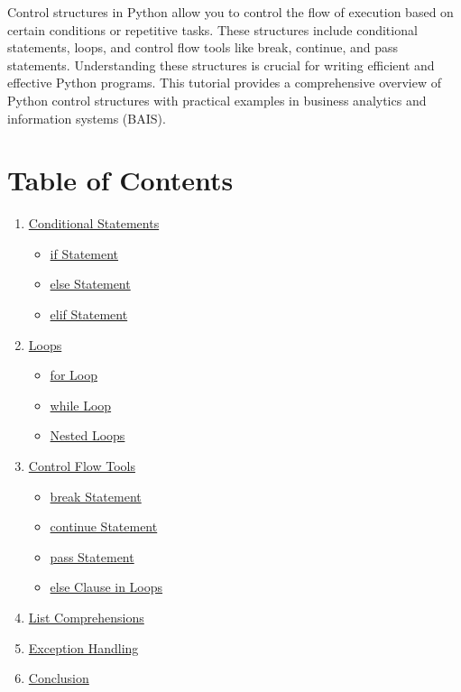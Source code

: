 \documentclass[
  letterpaper,
  DIV=11,
  numbers=noendperiod]{scrreprt}
\providecommand{\tightlist}{%
  \setlength{\itemsep}{0pt}\setlength{\parskip}{0pt}}\usepackage{longtable,booktabs,array}
\begin{document}
Control structures in Python allow you to control the flow of execution
based on certain conditions or repetitive tasks. These structures
include conditional statements, loops, and control flow tools like
break, continue, and pass statements. Understanding these structures is
crucial for writing efficient and effective Python programs. This
tutorial provides a comprehensive overview of Python control structures
with practical examples in business analytics and information systems
(BAIS).

\section{Table of Contents}\label{table-of-contents-1}

\begin{enumerate}
\def\labelenumi{\arabic{enumi}.}
\tightlist
\item
  \hyperref[conditional-statements]{Conditional Statements}

  \begin{itemize}
  \tightlist
  \item
    \hyperref[if-statement]{if Statement}
  \item
    \hyperref[else-statement]{else Statement}
  \item
    \hyperref[elif-statement]{elif Statement}
  \end{itemize}
\item
  \hyperref[loops]{Loops}

  \begin{itemize}
  \tightlist
  \item
    \hyperref[for-loop]{for Loop}
  \item
    \hyperref[while-loop]{while Loop}
  \item
    \hyperref[nested-loops]{Nested Loops}
  \end{itemize}
\item
  \hyperref[control-flow-tools]{Control Flow Tools}

  \begin{itemize}
  \tightlist
  \item
    \hyperref[break-statement]{break Statement}
  \item
    \hyperref[continue-statement]{continue Statement}
  \item
    \hyperref[pass-statement]{pass Statement}
  \item
    \hyperref[else-clause-in-loops]{else Clause in Loops}
  \end{itemize}
\item
  \hyperref[list-comprehensions]{List Comprehensions}
\item
  \hyperref[exception-handling]{Exception Handling}
\item
  \hyperref[conclusion]{Conclusion}
\end{enumerate}
\end{document}
